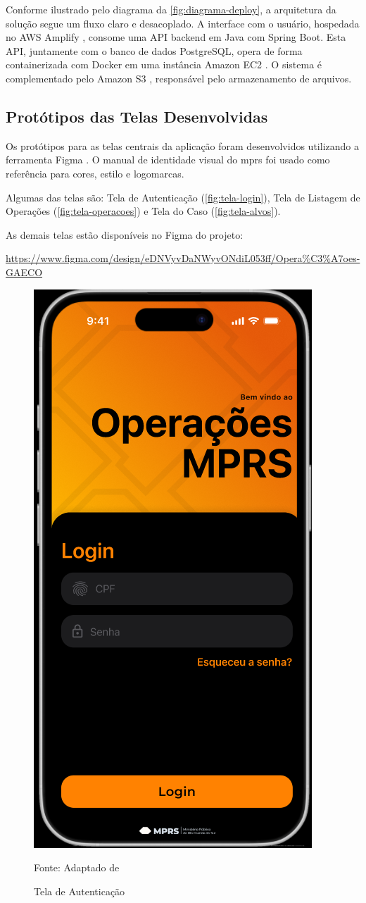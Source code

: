   Conforme ilustrado pelo diagrama da \autoref{fig:diagrama-deploy}, a arquitetura da solução segue um fluxo claro e desacoplado. A interface com o usuário, hospedada no AWS Amplify \cite{amplify}, consome uma API backend em Java \cite{java} com Spring Boot. Esta API, juntamente com o banco de dados PostgreSQL, opera de forma containerizada com Docker \cite{docker} em uma instância Amazon EC2 \cite{ec2}. O sistema é complementado pelo Amazon S3 \cite{s3}, responsável pelo armazenamento de arquivos.

\subsection{Protótipos das Telas Desenvolvidas}
  Os protótipos para as telas centrais da aplicação foram desenvolvidos utilizando a ferramenta Figma \cite{figma}. O manual de identidade visual do \acs{mprs} foi usado como referência para cores, estilo e logomarcas. 
  
  Algumas das telas são: Tela de Autenticação (\autoref{fig:tela-login}), Tela de Listagem de Operações (\autoref{fig:tela-operacoes}) e Tela do Caso (\autoref{fig:tela-alvos}).

  As demais telas estão disponíveis no Figma do projeto:
  
  \url{https://www.figma.com/design/eDNVyvDaNWyvONdiL053ff/Opera%C3%A7oes-GAECO}

  \begin{figure}[H]
    \centering
    \small
    \includegraphics[width=0.4\linewidth]{conteudo//2 - ages I//conteudo//figures//tela-login.png}
    \caption{Tela de Autenticação}
    Fonte: Adaptado de \textcites{figma-Operacoes GAECO}
    \label{fig:tela-login}
  \end{figure}


